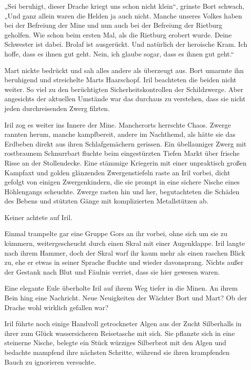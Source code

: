 „Sei beruhigt, dieser Drache kriegt uns schon nicht klein“, grinste Bort schwach, „Und ganz allein waren die Helden ja auch nicht. Manche unseres Volkes haben bei der Befreiung der Mine und nun auch bei der Befreiung der Rietburg geholfen. Wie schon beim ersten Mal, als die Rietburg erobert wurde. Deine Schwester ist dabei. Brolaf ist ausgerückt. Und natürlich der heroische Kram. Ich hoffe, dass es ihnen gut geht. Nein, ich glaube sogar, dass es ihnen gut geht.“

Mart nickte bedrückt und sah alles andere als überzeugt aus. Bort umarmte ihn beruhigend und streichelte Marts Haarschopf. Iril beachteten die beiden nicht weiter. So viel zu den berüchtigten Sicherheitskontrollen der Schildzwerge. Aber angesichts der aktuellen Umstände war das durchaus zu verstehen, dass sie nicht jeden durchreisenden Zwerg filzten.\bigskip







Iril zog es weiter ins Innere der Mine. Mancherorts herrschte Chaos. Zwerge rannten herum, manche kampfbereit, andere im Nachthemd, als hätte sie das Erdbeben direkt aus ihren Schlafgemächern gerissen. Ein übellauniger Zwerg mit rostbraunem Schnurrbart fluchte beim eingestürzten Tiefen Markt über frische Risse an der Stollendecke. Eine stämmige Kriegerin mit einer unpraktisch großen Kampfaxt und golden glänzenden Zwergenstiefeln raste an Iril vorbei, dicht gefolgt von einigen Zwergenkindern, die sie prompt in eine sichere Nische eines Höhlengangs scheuchte. Zwerge rasten hin und her, begutachteten die Schäden des Bebens und stützten Gänge mit komplizierten Metallstützen ab.

Keiner achtete auf Iril.

Einmal trampelte gar eine Gruppe Gors an ihr vorbei, ohne sich um sie zu kümmern, weitergescheucht durch einen Skral mit einer Augenklappe. Iril langte nach ihrem Hammer, doch der Skral warf ihr kaum mehr als einen raschen Blick zu, ehe er etwas in seiner Sprache fluchte und wieder davonsprang. Nichts außer der Gestank nach Blut und Fäulnis verriet, dass sie hier gewesen waren.

Eine elegante Eule überholte Iril auf ihrem Weg tiefer in die Minen. An ihrem Bein hing eine Nachricht. Neue Neuigkeiten der Wächter Bort und Mart? Ob der Drache wohl wirklich gefallen war?

Iril führte noch einige Handvoll getrockneter Algen aus der Zucht Silberhalls in ihrer zum Glück wassersicheren Reisetasche mit sich. Sie pflanzte sich in eine steinerne Nische, belegte ein Stück würziges Silberbrot mit den Algen und bedachte mampfend ihre nächsten Schritte, während sie ihren krampfenden Bauch zu ignorieren versuchte.

